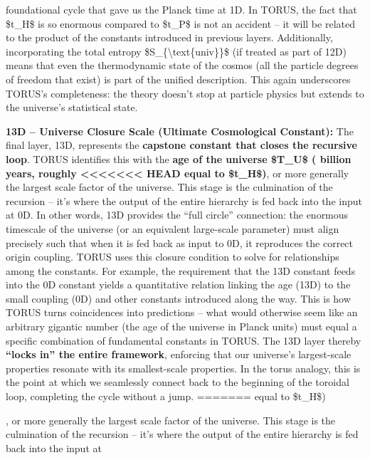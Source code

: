 \documentclass[]{article}
\begin{document}
\begin{itemize}
{  foundational cycle that gave us the Planck time at 1D. In TORUS, the
  fact that \$t\_H\$ is so enormous compared to \$t\_P\$ is not an
  accident -- it will be related to the product of the constants
  introduced in previous layers. Additionally, incorporating the total
  entropy \$S\_\{\textbackslash{}text\{univ\}\}\$ (if treated as part of
  12D) means that even the thermodynamic state of the cosmos (all the
  particle degrees of freedom that exist) is part of the unified
  description. This again underscores TORUS's completeness: the theory
  doesn't stop at particle physics but extends to the universe's
  statistical state.
\item
  \textbf{13D -- Universe Closure Scale (Ultimate Cosmological
  Constant):} The final layer, 13D, represents the \textbf{capstone
  constant that closes the recursive loop}. TORUS identifies this with
  the \textbf{age of the universe \$T\_U\$ ( billion years, roughly
<<<<<<< HEAD
  equal to \$t\_H\$)}\hspace{0pt}, or more generally the largest scale
  factor of the universe. This stage is the culmination of the recursion
  -- it's where the output of the entire hierarchy is fed back into the
  input at 0D. In other words, 13D provides the ``full circle''
  connection: the enormous timescale of the universe (or an equivalent
  large-scale parameter) must align precisely such that when it is fed
  back as input to 0D, it reproduces the correct origin coupling. TORUS
  uses this closure condition to solve for relationships among the
  constants. For example, the requirement that the 13D constant feeds
  into the 0D constant yields a quantitative relation linking the age
  (13D) to the small coupling (0D) and other constants introduced along
  the way\hspace{0pt}. This is how TORUS turns coincidences into
  predictions -- what would otherwise seem like an arbitrary gigantic
  number (the age of the universe in Planck units) must equal a specific
  combination of fundamental constants in TORUS. The 13D layer thereby
  \textbf{``locks in'' the entire framework}, enforcing that our
  universe's largest-scale properties resonate with its smallest-scale
  properties. In the torus analogy, this is the point at which we
  seamlessly connect back to the beginning of the toroidal loop,
  completing the cycle without a jump.
=======
  equal to \$t\_H\$)}​, or more generally the largest scale factor of
  the universe. This stage is the culmination of the recursion -- it's
  where the output of the entire hierarchy is fed back into the input at

\end{itemize}
\end{document}
